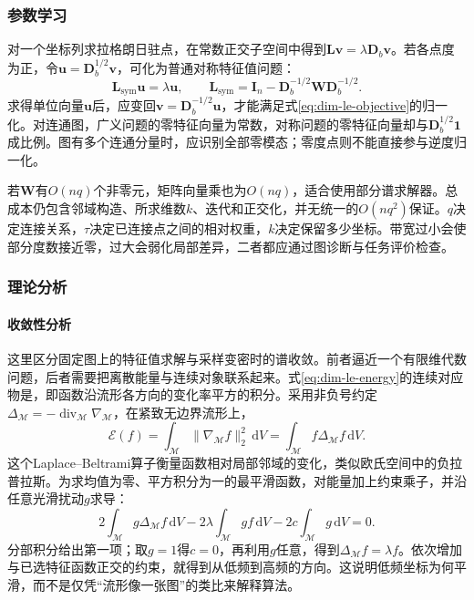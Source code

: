 \subsubsection{参数学习}

对一个坐标列求拉格朗日驻点，在常数正交子空间中得到$\bm{L}\bm{v}=\lambda\bm{D}_b\bm{v}$。若各点度为正，令$\bm{u}=\bm{D}_b^{1/2}\bm{v}$，可化为普通对称特征值问题：
\[
  \bm{L}_{\mathrm{sym}}\bm{u}=\lambda\bm{u},
  \qquad
  \bm{L}_{\mathrm{sym}}
  =\bm{I}_n-\bm{D}_b^{-1/2}\bm{W}\bm{D}_b^{-1/2}.
\]
求得单位向量$\bm{u}$后，应变回$\bm{v}=\bm{D}_b^{-1/2}\bm{u}$，才能满足式\eqref{eq:dim-le-objective}的归一化。对连通图，广义问题的零特征向量为常数，对称问题的零特征向量却与$\bm{D}_b^{1/2}\bm{1}$成比例。图有多个连通分量时，应识别全部零模态；零度点则不能直接参与逆度归一化。

若$\bm{W}$有$O(nq)$个非零元，矩阵向量乘也为$O(nq)$，适合使用部分谱求解器。总成本仍包含邻域构造、所求维数$k$、迭代和正交化，并无统一的$O(nq^2)$保证。$q$决定连接关系，$\tau$决定已连接点之间的相对权重，$k$决定保留多少坐标。带宽过小会使部分度数接近零，过大会弱化局部差异，二者都应通过图诊断与任务评价检查。

\subsubsection{理论分析}
\label{sec:dim-le-theory}

\paragraph{收敛性分析}

这里区分固定图上的特征值求解与采样变密时的谱收敛。前者逼近一个有限维代数问题，后者需要把离散能量与连续对象联系起来。式\eqref{eq:dim-le-energy}的连续对应物是，即函数沿流形各方向的变化率平方的积分。采用非负号约定$\Delta_{\mathcal{M}}=-\operatorname{div}_{\mathcal{M}}\nabla_{\mathcal{M}}$，在紧致无边界流形上，
\begin{equation}
  \label{eq:dim-dirichlet}
  \mathcal{E}(f)
  =\int_{\mathcal{M}}\lVert\nabla_{\mathcal{M}}f\rVert_2^2\,\mathrm{d}V
  =\int_{\mathcal{M}}f\Delta_{\mathcal{M}}f\,\mathrm{d}V.
\end{equation}
这个Laplace--Beltrami算子衡量函数相对局部邻域的变化，类似欧氏空间中的负拉普拉斯。为求均值为零、平方积分为一的最平滑函数，对能量加上约束乘子，并沿任意光滑扰动$g$求导：
\[
  2\int_{\mathcal{M}}g\Delta_{\mathcal{M}}f\,\mathrm{d}V
  -2\lambda\int_{\mathcal{M}}gf\,\mathrm{d}V
  -2c\int_{\mathcal{M}}g\,\mathrm{d}V=0.
\]
分部积分给出第一项；取$g=1$得$c=0$，再利用$g$任意，得到$\Delta_{\mathcal{M}}f=\lambda f$。依次增加与已选特征函数正交的约束，就得到从低频到高频的方向。这说明低频坐标为何平滑，而不是仅凭“流形像一张图”的类比来解释算法。

